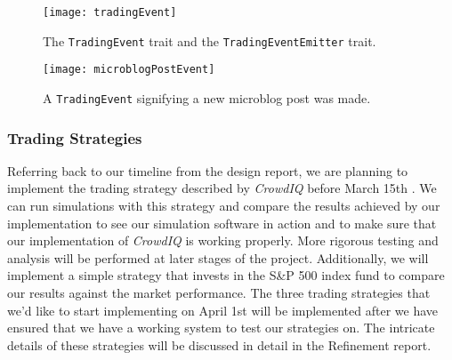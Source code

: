 \begin{figure}[h]
  \label{tradingEvent}
  \begin{center}
    \texttt{[image: tradingEvent]}
  \end{center}
  \caption{The \texttt{TradingEvent} trait and the \texttt{TradingEventEmitter} trait.}
\end{figure}

\begin{figure}[h]
  \label{microblogPostEvent}
  \begin{center}
    \texttt{[image: microblogPostEvent]}
  \end{center}
  \caption{A \texttt{TradingEvent} signifying a new microblog post was made.}
\end{figure}

\subsubsection{Trading Strategies}

Referring back to our timeline from the design report, we are planning to implement the trading strategy described by \textit{CrowdIQ} before March 15th \cite{crowdiq}.
We can run simulations with this strategy and compare the results achieved by our implementation to see our simulation software in action and to make sure that our implementation of \textit{CrowdIQ} is working properly.
More rigorous testing and analysis will be performed at later stages of the project.
Additionally, we will implement a simple strategy that invests in the S\&P 500 index fund to compare our results against the market performance.
The three trading strategies that we'd like to start implementing on April 1st will be implemented after we have ensured that we have a working system to test our strategies on.
The intricate details of these strategies will be discussed in detail in the Refinement report.


